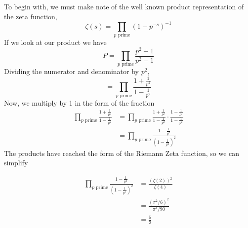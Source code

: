 \documentclass{article}
\begin{document}
To begin with, we must make note of the well known product representation of the zeta function,
\begin{equation*}
    \zeta(s)=\prod_{\text{$p$ prime}} (1-p^{-s})^{-1}
\end{equation*}
If we look at our product we have
\begin{equation*}
    P=\prod_{\text{$p$ prime}} \frac{p^2+1}{p^2-1}
\end{equation*}
Dividing the numerator and denominator by $p^2$,
\begin{equation*}
    =\prod_{\text{$p$ prime}} \frac{1+\frac{1}{p^2}}{1-\frac{1}{p^2}}
\end{equation*}
Now, we multiply by 1 in the form of the fraction
\begin{equation*}
    \begin{split}
        \prod_{\text{$p$ prime}} \frac{1+\frac{1}{p^2}}{1-\frac{1}{p^2}}&=\prod_{\text{$p$ prime}} \frac{1+\frac{1}{p^2}}{1-\frac{1}{p^2}}\cdot\frac{1-\frac{1}{p^2}}{1-\frac{1}{p^2}} \\
        &= \prod_{\text{$p$ prime}} \frac{1-\frac{1}{p^4}}{\left(1-\frac{1}{p^2}\right)^2}
    \end{split}
\end{equation*}
The products have reached the form of the Riemann Zeta function, so we can simplify 

\begin{equation*}
    \begin{split}
         \prod_{\text{$p$ prime}} \frac{1-\frac{1}{p^4}}{\left(1-\frac{1}{p^2}\right)^2}&=\frac{(\zeta(2))^2}{\zeta(4)} \\
         &= \frac{(\pi^2/6)^2}{\pi^4/90} \\
         &=\frac{5}{2}
    \end{split}
\end{equation*}
\end{document}
